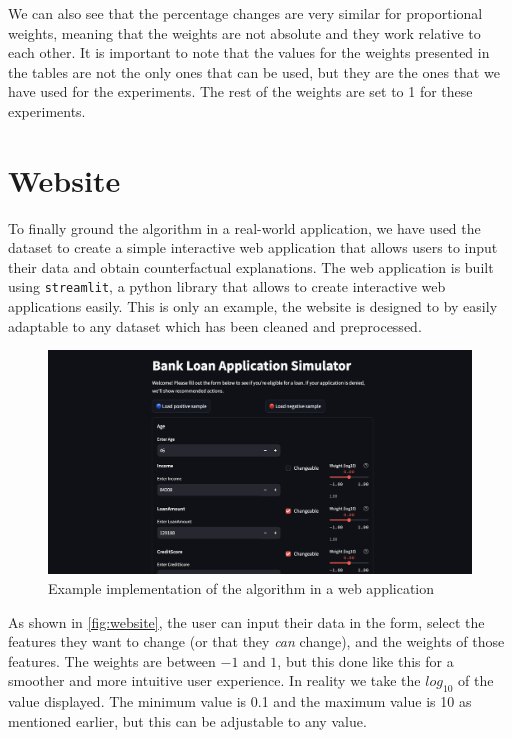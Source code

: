 \documentclass[12pt]{extarticle}
\numberwithin{equation}{section}
\begin{document}
We can also see that the percentage changes are very similar for proportional weights, meaning that the weights are not absolute and they work relative to each other. It is important to note that the values for the weights presented in the tables are not the only ones that can be used, but they are the ones that we have used for the experiments. The rest of the weights are set to 1 for these experiments.

\section{Website}\label{sec:website}
To finally ground the algorithm in a real-world application, we have used the ~\cite{kaggleLoan1} dataset to create a simple interactive web application that allows users to input their data and obtain counterfactual explanations. The web application is built using \texttt{streamlit}, a python library that allows to create interactive web applications easily. This is only an example, the website is designed to by easily adaptable to any dataset which has been cleaned and preprocessed. 

\begin{figure}[H]
    \centering
    \includegraphics[width=1\textwidth]{images/website}
    \caption{Example implementation of the algorithm in a web application}
    \label{fig:website}
\end{figure}

As shown in \autoref{fig:website}, the user can input their data in the form, select the features they want to change (or that they \emph{can} change), and the weights of those features. The weights are between $-1$ and $1$, but this done like this for a smoother and more intuitive user experience. In reality we take the $log_{10}$ of the value displayed. The minimum value is 0.1 and the maximum value is 10 as mentioned earlier, but this can be adjustable to any value. 
\end{document}
